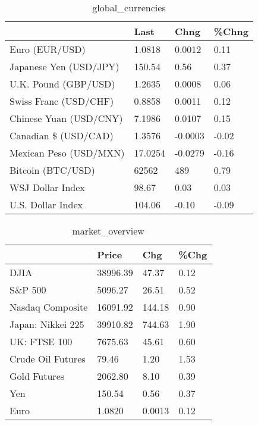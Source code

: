 \documentclass{article}%
\begin{document}
%


\begin{table}[htbp]%
\caption{global\_currencies}%
\centering%
\begin{adjustbox}{width=1\textwidth}%
\begin{tabular}{llll}
\toprule
                       &    Last &    Chng & \%Chng \\
\midrule
        Euro (EUR/USD) &  1.0818 &  0.0012 &  0.11 \\
Japanese Yen (USD/JPY) &  150.54 &    0.56 &  0.37 \\
  U.K. Pound (GBP/USD) &  1.2635 &  0.0008 &  0.06 \\
 Swiss Franc (USD/CHF) &  0.8858 &  0.0011 &  0.12 \\
Chinese Yuan (USD/CNY) &  7.1986 &  0.0107 &  0.15 \\
  Canadian \$ (USD/CAD) &  1.3576 & -0.0003 & -0.02 \\
Mexican Peso (USD/MXN) & 17.0254 & -0.0279 & -0.16 \\
     Bitcoin (BTC/USD) &   62562 &     489 &  0.79 \\
      WSJ Dollar Index &   98.67 &    0.03 &  0.03 \\
     U.S. Dollar Index &  104.06 &   -0.10 & -0.09 \\
\bottomrule
\end{tabular}
%
\end{adjustbox}%
\end{table}

%


\begin{table}[htbp]%
\caption{market\_overview}%
\centering%
\begin{adjustbox}{width=1\textwidth}%
\begin{tabular}{llll}
\toprule
                  &    Price &    Chg & \%Chg \\
\midrule
             DJIA & 38996.39 &  47.37 & 0.12 \\
          S\&P 500 &  5096.27 &  26.51 & 0.52 \\
 Nasdaq Composite & 16091.92 & 144.18 & 0.90 \\
Japan: Nikkei 225 & 39910.82 & 744.63 & 1.90 \\
     UK: FTSE 100 &  7675.63 &  45.61 & 0.60 \\
Crude Oil Futures &    79.46 &   1.20 & 1.53 \\
     Gold Futures &  2062.80 &   8.10 & 0.39 \\
              Yen &   150.54 &   0.56 & 0.37 \\
             Euro &   1.0820 & 0.0013 & 0.12 \\
\bottomrule
\end{tabular}
%
\end{adjustbox}%
\end{table}

%
\end{document}

